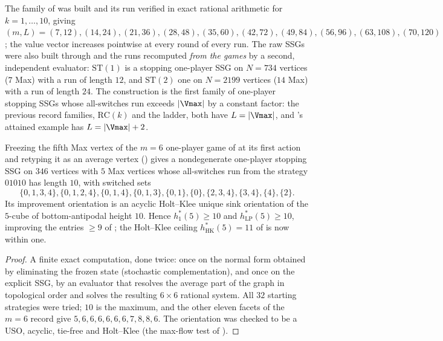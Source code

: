 \begin{remark}\label{oph:measured}
The family of  was built and its run verified in exact rational
arithmetic for $k=1,\dots,10$, giving
$(m,L)=(7,12),(14,24),(21,36),(28,48),(35,60),(42,72),(49,84),(56,96),(63,108),(70,120)$;
the value vector increases pointwise at every round of every run. The raw SSGs were
also built through  and the runs recomputed \emph{from the games}
by a second, independent evaluator: $\mathrm{ST}(1)$ is a stopping one-player SSG on
$N=734$ vertices ($7$ Max) with a run of length $12$, and $\mathrm{ST}(2)$ one on
$N=2199$ vertices ($14$ Max) with a run of length $24$. The construction is the first
family of one-player stopping SSGs whose all-switches run exceeds $|\Vmax|$ by a
constant factor: the previous record families, $\mathrm{RC}(k)$ and the ladder, both
have $L=|\Vmax|$, and 's attained example has $L=|\Vmax|+2$.
\end{remark}

\begin{proposition}[$h^{\ast}_{1}(5)\ge10$]\label{oph:h5}
Freezing the fifth Max vertex of the $m=6$ one-player game of  at its
first action and retyping it as an average vertex () gives a
nondegenerate one-player stopping SSG on $346$ vertices with $5$ Max vertices whose
all-switches run from the strategy $01010$ has length $10$, with switched sets
\[
 \{0,1,3,4\},\{0,1,2,4\},\{0,1,4\},\{0,1,3\},\{0,1\},\{0\},\{2,3,4\},\{3,4\},\{4\},\{2\}.
\]
Its improvement orientation is an acyclic Holt--Klee unique sink orientation of the
$5$-cube of bottom-antipodal height $10$. Hence $h^{\ast}_{1}(5)\ge10$ and
$h^{\ast}_{\mathrm{LP}}(5)\ge10$, improving the entries $\ge9$ of
; the Holt--Klee ceiling $h^{\ast}_{\mathrm{HK}}(5)=11$ of
 is now within one.
\end{proposition}

\begin{proof}
A finite exact computation, done twice: once on the normal form obtained by
eliminating the frozen state (stochastic complementation), and once on the explicit
SSG, by an evaluator that resolves the average part of the graph in topological order
and solves the resulting $6\times6$ rational system. All $32$ starting strategies were
tried; $10$ is the maximum, and the other eleven facets of the $m=6$ record give
$5,6,6,6,6,6,6,7,8,8,6$. The orientation was checked to be a USO, acyclic, tie-free
and Holt--Klee (the max-flow test of ).
\end{proof}

